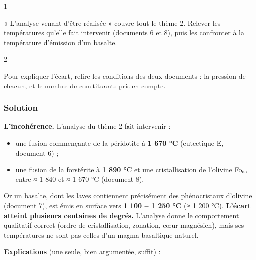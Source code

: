 \documentclass[11pt,a4paper]{article}
\providecommand{\tightlist}{\setlength{\itemsep}{0pt}\setlength{\parskip}{0pt}}
\begin{document}
\begin{indication}{1}

« L'analyse venant d'être réalisée » couvre tout le thème 2. Relever les températures qu'elle fait intervenir (documents 6 et 8), puis les confronter à la température d'émission d'un basalte.

\end{indication}

\begin{indication}{2}

Pour expliquer l'écart, relire les conditions des deux documents : la pression de chacun, et le nombre de constituants pris en compte.

\end{indication}

\hypertarget{solution-26}{%
\subsubsection{Solution}\label{solution-26}}

\textbf{L'incohérence.} L'analyse du thème 2 fait intervenir :

\begin{itemize}
\tightlist
\item
  une fusion commençante de la péridotite à \textbf{1 670 °C} (eutectique E, document 6) ;
\item
  une fusion de la forstérite à \textbf{1 890 °C} et une cristallisation de l'olivine Fo₈₀ entre ≈ 1 840 et ≈ 1 670 °C (document 8).
\end{itemize}

Or un basalte, dont les laves contiennent précisément des phénocristaux d'olivine (document 7), est émis en surface vers \textbf{1 100 -- 1 250 °C} (≈ 1 200 °C). \textbf{L'écart atteint plusieurs centaines de degrés.} L'analyse donne le comportement qualitatif correct (ordre de cristallisation, zonation, cœur magnésien), mais ses températures ne sont pas celles d'un magma basaltique naturel.

\textbf{Explications} (une seule, bien argumentée, suffit) :
\end{document}

